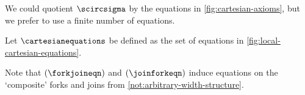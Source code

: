 

We could quotient \(\scircsigma\) by the equations in
\cref{fig:cartesian-axioms}, but we prefer to use a finite number of equations.

\begin{definition}
    Let \(\cartesianequations\) be defined as the set of equations in
    \cref{fig:local-cartesian-equations}.
\end{definition}

\begin{remark}
    Note that \((\forkjoineqn)\) and \((\joinforkeqn)\) induce equations on the
    `composite' forks and joins from \cref{not:arbitrary-width-structure}.
\end{remark}



